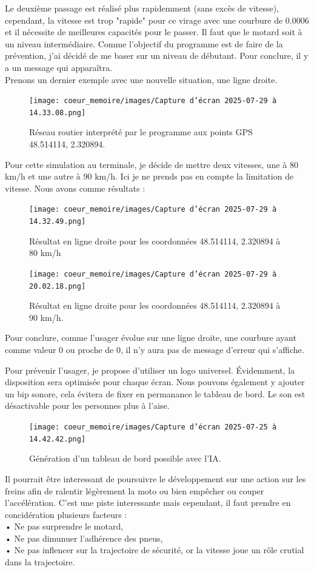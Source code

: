 Le deuxième passage est réalisé plus rapidemment (sans excès de vitesse), cependant, la vitesse est trop "rapide" pour ce virage avec une courbure de 0.0006 et il nécessite de meilleures capacités pour le passer. Il faut que le motard soit à un niveau intermédiaire. Comme l'objectif du programme est de faire de la prévention, j'ai décidé de me baser sur un niveau de débutant. Pour conclure, il y a un message qui apparaîtra.\\
Prenons un dernier exemple avec une nouvelle situation, une ligne droite.
\begin{figure}[H]
    \centering
    \texttt{[image: coeur\_memoire/images/Capture d’écran 2025-07-29 à 14.33.08.png]} 
    \caption{Réseau routier interprété par le programme aux points GPS 48.514114, 2.320894.}
\end{figure}
Pour cette simulation au terminale, je décide de mettre deux vitesses, une à 80 km/h et une autre à 90 km/h. Ici je ne prends pas en compte la limitation de vitesse. Nous avons comme résultats :
\begin{figure}[H]
    \centering
    \texttt{[image: coeur\_memoire/images/Capture d’écran 2025-07-29 à 14.32.49.png]} 
    \caption{Résultat en ligne droite pour les coordonnées 48.514114, 2.320894 à 80 km/h}
\end{figure}
\begin{figure}[H]
    \centering
    \texttt{[image: coeur\_memoire/images/Capture d’écran 2025-07-29 à 20.02.18.png]} 
    \caption{Résultat en ligne droite pour les coordonnées 48.514114, 2.320894 à 90 km/h.}
\end{figure}
Pour conclure, comme l'usager évolue sur une ligne droite, une courbure ayant comme valeur 0 ou proche de 0, il n'y aura pas de message d'erreur qui s'affiche.

Pour prévenir l'usager, je propose d'utiliser un logo universel. Évidemment, la disposition sera optimisée pour chaque écran. Nous pouvons également y ajouter un bip sonore, cela évitera de fixer en permanance le tableau de bord. Le son est désactivable pour les personnes plus à l'aise.
\begin{figure}[H]
    \centering
    \texttt{[image: coeur\_memoire/images/Capture d’écran 2025-07-25 à 14.42.42.png]} 
    \caption{Génération d'un tableau de bord possible avec l'IA.}
\end{figure}

Il pourrait être interessant de poursuivre le développement sur une action sur les freins afin de ralentir légèrement la moto ou bien empêcher ou couper l'accélération. C'est une piste interessante mais cependant, il faut prendre en concidération plusieurs facteurs : \\
• Ne pas surprendre le motard,\\
• Ne pas dimunuer l'adhérence des pneus,\\
• Ne pas inflencer sur la trajectoire de sécurité, or la vitesse joue un rôle crutial dans la trajectoire.
